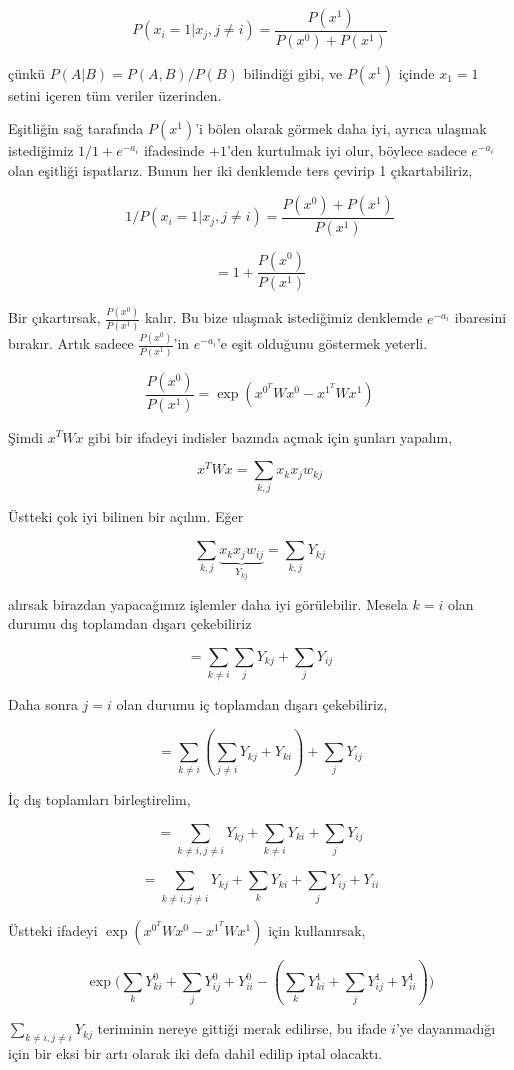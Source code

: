 \documentclass[12pt,fleqn]{article}\usepackage{../../common}
\begin{document}
$$  
P(x_i = 1 | x_j,j \ne i)  = \frac{P(x^1)}{P(x^0) + P(x^1)} 
$$

çünkü $P(A|B) = P(A,B) / P(B)$ bilindiği gibi, ve $P(x^1)$ içinde $x_1=1$
setini içeren tüm veriler üzerinden. 

Eşitliğin sağ tarafında $P(x^1)$'i bölen olarak görmek daha iyi, ayrıca
ulaşmak istediğimiz $1/1 + e^{-a_i}$ ifadesinde $+1$'den kurtulmak iyi
olur, böylece sadece $e^{-a_i}$ olan eşitliği ispatlarız. Bunun her iki
denklemde ters çevirip 1 çıkartabiliriz,

$$  
1 / P(x_i = 1 | x_j,j \ne i) = \frac{P(x^0) + P(x^1)}{P(x^1)} 
$$

$$
= 1 + \frac{ P(x^0)}{P(x^1)}
$$

Bir çıkartırsak, $\frac{ P(x^0)}{P(x^1)}$ kalır. Bu bize ulaşmak
istediğimiz denklemde $e^{-a_i}$ ibaresini bırakır. Artık sadece
$\frac{P(x^0)}{P(x^1)}$'in $e^{-a_i}$'e eşit olduğunu göstermek yeterli.


$$ 
\frac{ P(x^0)}{P(x^1)} = \exp( x^{0^T}Wx^0 -   x^{1^T}Wx^1 )
$$

Şimdi $x^TWx$ gibi bir ifadeyi indisler bazında açmak için şunları yapalım, 

$$ 
x^TWx = \sum_{k,j} x_kx_jw_{kj} 
$$

Üstteki çok iyi bilinen bir açılım. Eğer

$$ 
\sum_{k,j} \underbrace{x_kx_jw_{ij}}_{Y_{kj}} = \sum_{k,j}Y_{kj} 
$$

alırsak birazdan yapacağımız işlemler daha iyi görülebilir. Mesela $k=i$
olan durumu dış toplamdan dışarı çekebiliriz

$$ 
= \sum_{k \ne i}\sum_j Y_{kj} + \sum_{j} Y_{ij}
$$

Daha sonra $j = i$ olan durumu iç toplamdan dışarı çekebiliriz, 

$$ 
= \sum_{k \ne i}( \sum_{j \ne i} Y_{kj} + Y_{ki}) + \sum_{j} Y_{ij}
$$

İç dış toplamları birleştirelim,

$$ 
= \sum_{k \ne i,j \ne i} Y_{kj} + \sum_{k \ne i}  Y_{ki} + \sum_{j} Y_{ij}
$$

$$ 
= \sum_{k \ne i,j \ne i} Y_{kj} + \sum_{k}  Y_{ki} + \sum_{j} Y_{ij} + Y_{ii}
$$

Üstteki ifadeyi $ \exp( x^{0^T}Wx^0 -   x^{1^T}Wx^1 )$ için kullanırsak,

$$ 
\exp 
\big( 
\sum_{k}  Y_{ki}^0 + \sum_{j} Y_{ij}^0 + Y_{ii}^0 - 
( \sum_{k}  Y_{ki}^1 + \sum_{j} Y_{ij}^1 + Y_{ii}^1  )
\big)
$$

$\sum_{k \ne i,j \ne i} Y_{kj}$ teriminin nereye gittiği merak edilirse,
bu ifade $i$'ye dayanmadığı için bir eksi bir artı olarak iki defa dahil
edilip iptal olacaktı. 
\end{document}
